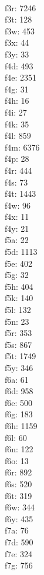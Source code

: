 \begin{multicols}{8}
  \\ f3r: 7246
  \\ f3t: 128
  \\ f3w: 453
  \\ f3x: 44
  \\ f3y: 33
  \\ f4d: 493
  \\ f4e: 2351
  \\ f4g: 31
  \\ f4h: 16
  \\ f4i: 27
  \\ f4k: 35
  \\ f4l: 859
  \\ f4m: 6376
  \\ f4p: 28
  \\ f4r: 444
  \\ f4s: 73
  \\ f4t: 1443
  \\ f4w: 96
  \\ f4x: 11
  \\ f4y: 21
  \\ f5a: 22
  \\ f5d: 1113
  \\ f5e: 402
  \\ f5g: 32
  \\ f5h: 404
  \\ f5k: 140
  \\ f5l: 132
  \\ f5n: 23
  \\ f5r: 353
  \\ f5s: 867
  \\ f5t: 1749
  \\ f5y: 346
  \\ f6a: 61
  \\ f6d: 958
  \\ f6e: 500
  \\ f6g: 183
  \\ f6h: 1159
  \\ f6l: 60
  \\ f6n: 122
  \\ f6o: 13
  \\ f6r: 892
  \\ f6s: 520
  \\ f6t: 319
  \\ f6w: 344
  \\ f6y: 435
  \\ f7a: 76
  \\ f7d: 590
  \\ f7e: 324
  \\ f7g: 756

\end{multicols}
